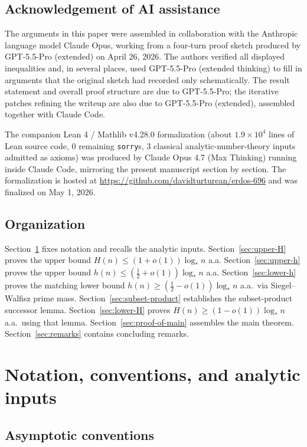 \documentclass[11pt,reqno]{amsart}
\theoremstyle{plain}
\theoremstyle{definition}
\newcommand{\logstar}{\log_{\!*}}
\begin{document}
\subsection{Acknowledgement of AI assistance}

The arguments in this paper were assembled in collaboration with the Anthropic
language model Claude Opus, working from a four-turn proof sketch produced by
GPT-5.5-Pro (extended) on April 26, 2026. The authors verified all
displayed inequalities and, in several places, used GPT-5.5-Pro (extended
thinking) to fill in arguments that the original sketch had recorded only
schematically. The result statement and overall proof structure are due to
GPT-5.5-Pro; the iterative patches refining the writeup are also due to
GPT-5.5-Pro (extended), assembled together with Claude Code.

The companion Lean 4 / Mathlib v4.28.0 formalization (about
$1.9 \times 10^4$ lines of Lean source code, $0$ remaining \texttt{sorry}s,
$3$ classical analytic-number-theory inputs admitted as axioms) was produced
by Claude Opus 4.7 (Max Thinking) running inside Claude Code, mirroring the
present manuscript section by section.  The formalization is hosted at
\url{https://github.com/davidturturean/erdos-696} and was finalized on
May 1, 2026.

\subsection{Organization}

Section~\ref{sec:notation} fixes notation and recalls the analytic inputs.
Section~\ref{sec:upper-H} proves the upper bound $H(n)\le(1+o(1))\logstar n$ a.a.
Section~\ref{sec:upper-h} proves the upper bound $h(n)\le(\tfrac12+o(1))\logstar n$ a.a.
Section~\ref{sec:lower-h} proves the matching lower bound $h(n)\ge(\tfrac12-o(1))\logstar n$ a.a.\ via Siegel--Walfisz prime mass.
Section~\ref{sec:subset-product} establishes the subset-product successor lemma.
Section~\ref{sec:lower-H} proves $H(n)\ge(1-o(1))\logstar n$ a.a.\ using that lemma.
Section~\ref{sec:proof-of-main} assembles the main theorem.
Section~\ref{sec:remarks} contains concluding remarks.

\section{Notation, conventions, and analytic inputs}\label{sec:notation}

\subsection{Asymptotic conventions}
\end{document}
